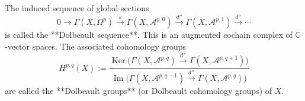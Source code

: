 The induced sequence of global sections
$$
0 \rightarrow \Gamma(X, \Omega^p) \xrightarrow{\varepsilon} \Gamma(X, \mathcal{A}^{p,0}) \xrightarrow{d''} \Gamma(X, \mathcal{A}^{p,1}) \xrightarrow{d''} \cdots
$$
is called the **Dolbeault sequence**. This is an augmented cochain complex of $\mathbb{C}$-vector spaces. The associated cohomology groups
$$
H^{p,q}(X) := \frac{\operatorname{Ker}\bigl(\Gamma(X, \mathcal{A}^{p,q}) \xrightarrow{d''} \Gamma(X, \mathcal{A}^{p,q+1})\bigr)}{\operatorname{Im}\bigl(\Gamma(X, \mathcal{A}^{p,q-1}) \xrightarrow{d''} \Gamma(X, \mathcal{A}^{p,q})\bigr)}
$$
are called the **Dolbeault groups** (or Dolbeault cohomology groups) of $X$.
